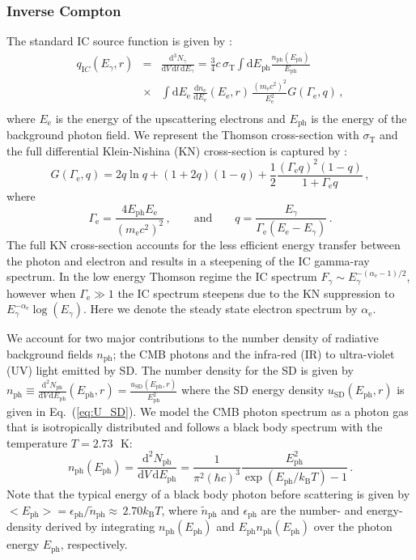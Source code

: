 \documentclass[10pt,aps,pra,reprint,amsmath,amsfonts,amssymb,showpacs]{revtex4-1}
\newcommand{\rmn}{\mathrm}
\newcommand{\ph}{\rmn{ph}}
\newcommand{\eph}{E_\ph}
\newcommand{\sd}{\rmn{SD}}
\newcommand{\ee}{E_\rmn{e}}
\newcommand{\B}{\rmn{B}}
\newcommand{\dd}{\rmn{d}}
\newcommand{\e}{\rmn{e}}
\newcommand{\eg}{E_\gamma}
\begin{document}
\subsubsection{Inverse Compton}
\label{sect:IC}
The standard IC source function is given by
\cite{1979rpa..book.....R}:
\begin{eqnarray}
  q_{\rmn IC}(\eg, r) &=&  \frac{\dd^3 N_\gamma}{\dd V\,\dd t\,\dd \eg} = 
 \frac{3}{4}c\,\sigma_\rmn{T}
\int\dd \eph \frac{n_\rmn{ph}(\eph)}{\eph}\nonumber\\
&\times& \int \dd \ee\,\frac{\dd n_\e}{\dd \ee}(\ee,r)\,
 \frac{\left(m_\e c^2\right)^2}{\ee^2}G(\Gamma_\e,q)\,,\nonumber\\
  \label{eq:ICemiss}
\end{eqnarray}
where $\ee$ is the energy of the upscattering electrons and $\eph$ is
the energy of the background photon field. We represent the Thomson
cross-section with $\sigma_\rmn{T}$ and the full differential
Klein-Nishina (KN) cross-section is captured by
\cite{1970RvMP...42..237B}:
\begin{equation}
\label{eq:KN_spec}
G(\Gamma_\e,q) = 2q\ln{q}+(1+2q)(1-q)+ 
\frac{1}{2}\frac{\left(\Gamma_\e q\right)^2\left(1-q\right)}
     {1+\Gamma_\e q}\,,
\end{equation}
where
\begin{equation}
\Gamma_\e=\frac{4\eph \ee}{\left(m_\e c^2\right)^2}\,,\qquad \rmn{and} \qquad  
q=\frac{\eg}{\Gamma_\e\left(\ee-\eg\right)}\,.
\end{equation}
The full KN cross-section accounts for the less efficient energy
transfer between the photon and electron and results in a steepening
of the IC gamma-ray spectrum. In the low energy Thomson regime the IC
spectrum $F_\gamma\sim E_\gamma^{-(\alpha_\e-1)/2}$, however when
$\Gamma_\e \gg 1$ the IC spectrum steepens due to the KN suppression
to $\eg^{-\alpha_\e}\log(\eg)$. Here we denote the steady
state electron spectrum by $\alpha_\e$.

We account for two major contributions to the number density of
radiative background fields $n_\ph$; the CMB photons and the infra-red
(IR) to ultra-violet (UV) light emitted by SD. The number density for
the SD is given by $n_\ph\equiv\frac{\dd^2 N_\ph}{\dd V \,\dd
  \eph}(\eph,r)= \frac{u_\sd(\eph,r)}{\eph^2}$ where the SD energy
density $u_\sd(\eph,r)$ is given in Eq.~(\ref{eq:U_SD}). We model the
CMB photon spectrum as a photon gas that is isotropically distributed
and follows a black body spectrum with the temperature $T=2.73\,$~K:
\begin{equation}
\label{eq:photon_gas}
  n_\rmn{ph}(\eph) = \frac{\dd^2 N_\ph}{\dd V \,\dd \eph} =
  \frac{1}{\pi^2(\hbar c)^3}\frac{\eph^2}{\exp(\eph/k_\B T)-1}\,.
\end{equation}
Note that the typical energy of a black body photon before scattering
is given by $<\eph>=\epsilon_\ph/\tilde{n}_\ph\approx\,2.70 k_\B T$,
where $\tilde{n}_\ph$ and $\epsilon_\ph$ are the number- and
energy-density derived by integrating $n_\ph(\eph)$ and $\eph
n_\ph(\eph)$ over the photon energy $\eph$, respectively.
\end{document}
